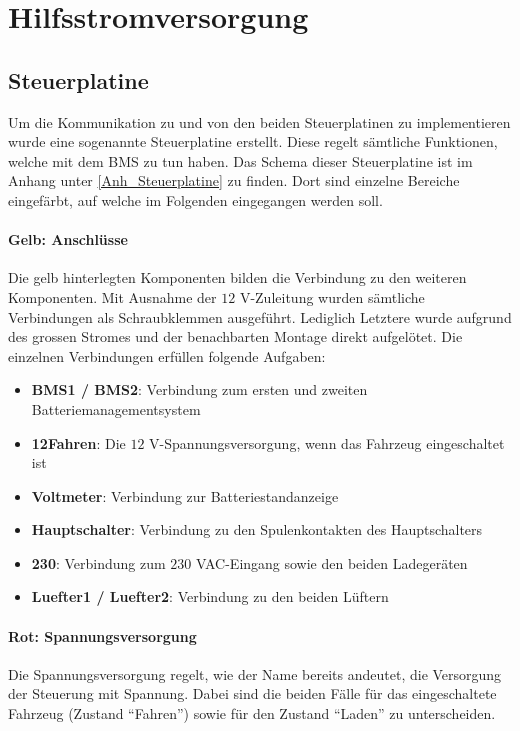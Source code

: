 \section{Hilfsstromversorgung}

\subsection{Steuerplatine}
Um die Kommunikation zu und von den beiden Steuerplatinen zu implementieren wurde eine sogenannte Steuerplatine erstellt. Diese regelt sämtliche Funktionen, welche mit dem BMS zu tun haben. Das Schema dieser Steuerplatine ist im Anhang unter \ref{Anh_Steuerplatine} zu finden. Dort sind einzelne Bereiche eingefärbt, auf welche im Folgenden eingegangen werden soll.

\paragraph{Gelb: Anschlüsse}
Die gelb hinterlegten Komponenten bilden die Verbindung zu den weiteren Komponenten. Mit Ausnahme der $12$ V-Zuleitung wurden sämtliche Verbindungen als Schraubklemmen ausgeführt. Lediglich Letztere wurde aufgrund des grossen Stromes und der benachbarten Montage direkt aufgelötet. Die einzelnen Verbindungen erfüllen folgende Aufgaben: \begin{itemize}
	\item \textbf{BMS1 / BMS2}: Verbindung zum ersten und zweiten Batteriemanagementsystem
	\item \textbf{12Fahren}: Die $12$ V-Spannungsversorgung, wenn das Fahrzeug eingeschaltet ist
	\item \textbf{Voltmeter}: Verbindung zur Batteriestandanzeige
	\item \textbf{Hauptschalter}: Verbindung zu den Spulenkontakten des Hauptschalters
	\item \textbf{230}: Verbindung zum $230$ VAC-Eingang sowie den beiden Ladegeräten
	\item \textbf{Luefter1 / Luefter2}: Verbindung zu den beiden Lüftern
\end{itemize}

\paragraph{Rot: Spannungsversorgung}
Die Spannungsversorgung regelt, wie der Name bereits andeutet, die Versorgung der Steuerung mit Spannung. Dabei sind die beiden Fälle für das eingeschaltete Fahrzeug (Zustand "`Fahren"') sowie für den Zustand "`Laden"' zu unterscheiden.


